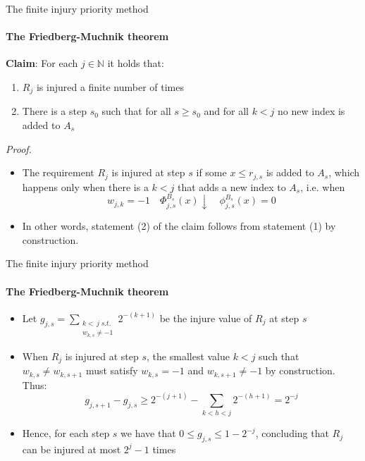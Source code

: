 \documentclass{beamer}
\newcommand{\N}{\mathbb{N}}                     %
\begin{document}
\begin{frame}{The finite injury priority method}
\framesubtitle{The Friedberg-Muchnik theorem}
    \textbf{Claim}: For each $j \in \N$ it holds that:
    \begin{enumerate}
        \item $R_j$ is injured a finite number of times
        \item There is a step $s_0$ such that for all $s \geq s_0$ and for all $k < j$ no new index is added to $A_s$
    \end{enumerate}

    \textit{Proof.}
    \begin{itemize}[<+->]
        \item The requirement $R_j$ is injured at step $s$ if some $x \leq r_{j,s}$ is added to $A_s$, which happens only when there is a $k < j$ that adds a new index to $A_s$, i.e. when
        \[w_{j,k} = -1 \quad \Phi_{j,s}^{B_s}(x) \downarrow \quad \phi_{j,s}^{B_s}(x) = 0\]
        \item In other words, statement (2) of the claim follows from statement (1) by construction.
    \end{itemize}
\end{frame}

\begin{frame}{The finite injury priority method}
\framesubtitle{The Friedberg-Muchnik theorem}
    \begin{itemize}[<+->]
        \item Let $g_{j,s} = \sum\limits_{\substack{k <\, j \; s.t. \\ w_{k,s} \neq -1}} 2^{-(k+1)}$ be the injure value of $R_j$ at step $s$
        \item When $R_j$ is injured at step $s$, the smallest value $k < j$ such that $w_{k,s} \neq w_{k,s+1}$ must satisfy $w_{k,s} = -1$ and $w_{k,s+1} \neq -1$ by construction. Thus:
        \[g_{j,s+1} - g_{j,s} \geq 2^{-(j+1)} - \sum_{k < h < j} 2^{-(h+1)} = 2^{-j}\]

        \item Hence, for each step $s$ we have that $0 \leq g_{j,s} \leq 1-2^{-j}$, concluding that $R_j$ can be injured at most $2^{j}-1$ times
    \end{itemize}
\end{frame}
\end{document}
